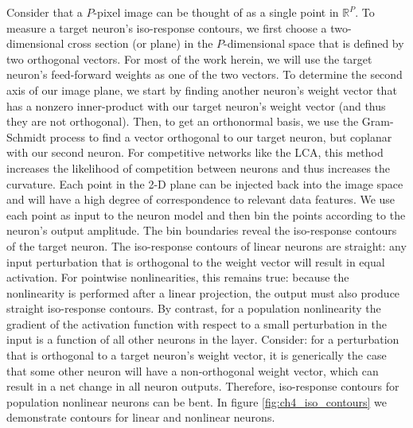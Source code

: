 Consider that a $P$-pixel image can be thought of as a single point in $\mathbb{R}^{P}$.
To measure a target neuron's iso-response contours, we first choose a two-dimensional cross section (or plane) in the $P$-dimensional space that is defined by two orthogonal vectors.
For most of the work herein, we will use the target neuron's feed-forward weights as one of the two vectors.
To determine the second axis of our image plane, we start by finding another neuron's weight vector that has a nonzero inner-product with our target neuron's weight vector (and thus they are not orthogonal).
Then, to get an orthonormal basis, we use the Gram-Schmidt process to find a vector orthogonal to our target neuron, but coplanar with our second neuron.
For competitive networks like the LCA, this method increases the likelihood of competition between neurons and thus increases the curvature. 
Each point in the 2-D plane can be injected back into the image space and will have a high degree of correspondence to relevant data features.
We use each point as input to the neuron model and then bin the points according to the neuron's output amplitude.
The bin boundaries reveal the iso-response contours of the target neuron.
The iso-response contours of linear neurons are straight: any input perturbation that is orthogonal to the weight vector will result in equal activation.
For pointwise nonlinearities, this remains true: because the nonlinearity is performed after a linear projection, the output must also produce straight iso-response contours.
By contrast, for a population nonlinearity the gradient of the activation function with respect to a small perturbation in the input is a function of all other neurons in the layer.
Consider: for a perturbation that is orthogonal to a target neuron's weight vector, it is generically the case that some other neuron will have a non-orthogonal weight vector, which can result in a net change in all neuron outputs.
Therefore, iso-response contours for population nonlinear neurons can be bent.
In figure \ref{fig:ch4_iso_contours} we demonstrate contours for linear and nonlinear neurons.

